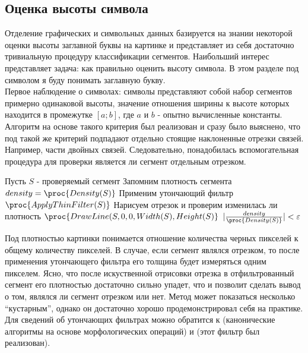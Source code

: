 \subsection{Оценка высоты символа}
\label{subsec:capheight}

\noindent
Отделение графических и символьных данных базируется на знании некоторой оценки высоты заглавной буквы на картинке и представляет из себя
достаточно тривиальную процедуру классификации сегментов. Наибольший интерес представляет задача: как правильно оценить высоту символа. В
этом разделе под символом я буду понимать заглавную букву. \\

\noindent
Первое наблюдение о символах: символы представляют собой набор сегментов примерно одинаковой высоты, значение отношения ширины к высоте которых
находится в промежутке $[a;b]$, где $a$ и $b$ - опытно вычисленные константы. Алгоритм на основе такого критерия был реализован и 
сразу было выяснено, что под такой же критерий подпадают отдельно стоящие наклоненные отрезки связей. Например, части двойных связей. 
Следовательно, понадобилась вспомогательная процедура для проверки является ли сегмент отдельным отрезком.

\begin{codebox}
  \li \Comment Пусть $S$ - проверяемый сегмент
  \li
  \li \Comment Запомним плотность сегмента
  \li $density = \proc{Density(S)}$
  \li
  \li \Comment Применим утончающий фильтр
  \li $\proc{ApplyThinFilter(S)}$
  \li
  \li \Comment Нарисуем отрезок и проверим изменилась ли плотность
  \li $\proc{DrawLine(S, 0, 0, Width(S), Height(S)}$
  \li
  \li \If $|\frac{density}{\proc{Density(S)}}| < \varepsilon$
  \li \Then \Return {} \End
  \li
  \li \Return {}
\end{codebox}

\noindent
Под плотностью картинки понимается отношение количества черных пикселей к общему количеству пикселей. В случае, если сегмент являлся отрезком, то
после применения утончающего фильтра его толщина будет измеряться одним пикселем. Ясно, что после искуственной отрисовки отрезка в отфильтрованный 
сегмент его плотностью достаточно сильно упадет, что и позволит сделать вывод о том, являлся ли сегмент отрезком или нет. Метод может показаться
несколько ``кустарным'', однако он достаточно хорошо продемонстрировал себя на практике. Для сведений об утончающих фильтрах можно обратится к 
\cite{gonzalez} (канонические алгоритмы на основе морфологических операций) и \cite{cychosz} (этот фильтр был реализован). \\

